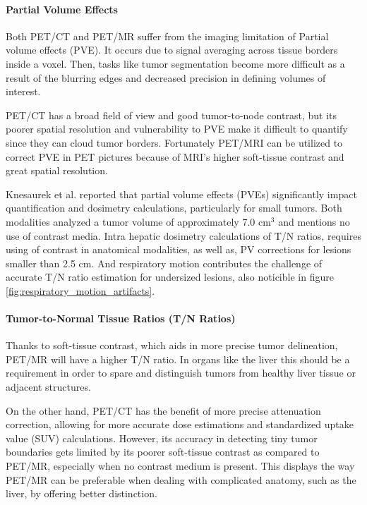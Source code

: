 \paragraph{Partial Volume Effects}

Both PET/CT and PET/MR suffer from the imaging limitation of Partial volume effects (PVE). It occurs due to signal averaging across tissue borders inside a voxel. Then, tasks like tumor segmentation become more difficult as a result of the blurring edges and decreased precision in defining volumes of interest. 

PET/CT has a broad field of view and good tumor-to-node contrast, but its poorer spatial resolution and vulnerability to PVE make it difficult to quantify since they can cloud tumor borders. Fortunately PET/MRI can be utilized to correct PVE in PET pictures because of MRI's higher soft-tissue contrast and great spatial resolution. 

Knesaurek et al. \cite{knesaurek2018} reported that partial volume effects (PVEs) significantly impact quantification and dosimetry calculations, particularly for small tumors. Both modalities analyzed a tumor volume of approximately 7.0 $\text{cm}^3$ and mentions no use of contrast media. Intra hepatic dosimetry calculations of T/N ratios, requires using of contrast in anatomical modalities, as well as,
PV corrections for lesions smaller than 2.5 $\text{cm}$. And respiratory motion contributes the challenge of accurate T/N ratio estimation for undersized lesions, also noticible in figure \ref{fig:respiratory_motion_artifacts}.

\paragraph{Tumor-to-Normal Tissue Ratios (T/N Ratios)}

Thanks to soft-tissue contrast, which aids in more precise tumor delineation, PET/MR will have a higher T/N ratio. In organs like the liver this should be a requirement in order to spare and distinguish tumors from healthy liver tissue or adjacent structures.


On the other hand, PET/CT has the benefit of more precise attenuation correction, allowing for more accurate dose estimations and standardized uptake value (SUV) calculations. However, its accuracy in detecting tiny tumor boundaries gets limited by its poorer soft-tissue contrast as compared to PET/MR, especially when no contrast medium is present. This displays the way PET/MR can be preferable when dealing with complicated anatomy, such as the liver, by offering better distinction.


